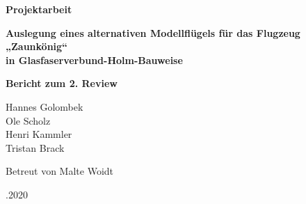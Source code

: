 
\begin{center}
\begin{LARGE}
	\par\bigskip
	\par\bigskip
	\par\bigskip
	\par\bigskip	
	\par\bigskip
	\par\bigskip	
	\textbf{Projektarbeit}\\
	\par\bigskip
	\par\bigskip	
	\par\bigskip
	\par\bigskip	
	\textbf{Auslegung eines alternativen Modellflügels für das Flugzeug „Zaunkönig“} \\
	\textbf{in Glasfaserverbund-Holm-Bauweise}\\
	\par\bigskip
	\par\bigskip
	
	\end{LARGE}
\begin{huge}
	\textbf{Bericht zum 2. Review}\\
\end{huge}
	\par\bigskip
\par\bigskip	
\par\bigskip
\par\bigskip
	\par\bigskip
\par\bigskip	
\par\bigskip
\par\bigskip	
	\par\bigskip
\par\bigskip	
\par\bigskip
\par\bigskip	

Hannes Golombek\\
Ole Scholz\\
Henri Kammler\\
Tristan Brack\\
\par\bigskip
\par\bigskip	
\par\bigskip

Betreut von Malte Woidt\\
\par\bigskip
\par\bigskip	
\par\bigskip
\par\bigskip	
\par\bigskip
\par{}.2020\\
\end{center}

